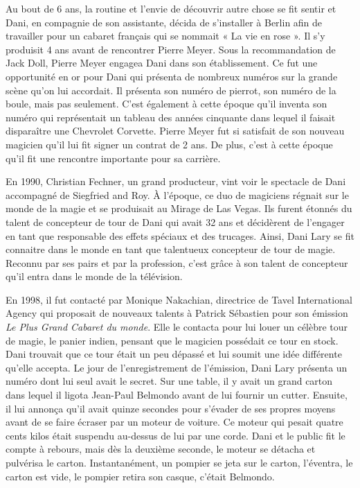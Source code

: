 Au bout de 6 ans, la routine et l’envie de découvrir autre chose se fit sentir et Dani, en compagnie de son assistante, décida de s’installer à Berlin afin de travailler pour un cabaret français qui se nommait « La vie en rose ». Il s’y produisit 4 ans avant de rencontrer Pierre Meyer. Sous la recommandation de Jack Doll, Pierre Meyer engagea Dani dans son établissement. Ce fut une opportunité en or pour Dani qui présenta de nombreux numéros sur la grande scène qu'on lui accordait. Il présenta son numéro de pierrot, son numéro de la boule, mais pas seulement. C’est également à cette époque qu’il inventa son numéro qui représentait un tableau des années cinquante dans lequel il faisait disparaître une Chevrolet Corvette. Pierre Meyer fut si satisfait de son nouveau magicien qu'il lui fit signer un contrat de 2 ans. De plus, c'est à cette époque qu’il fit une rencontre importante pour sa carrière.

En 1990, Christian Fechner, un grand producteur, vint voir le spectacle de Dani accompagné de Siegfried and Roy. À l’époque, ce duo de magiciens régnait sur le monde de la magie et se produisait au Mirage de Las Vegas. Ils furent étonnés du talent de concepteur de tour de Dani qui avait 32 ans et décidèrent de l’engager en tant que responsable des effets spéciaux et des trucages. Ainsi, Dani Lary se fit connaitre dans le monde en tant que talentueux concepteur de tour de magie. Reconnu par ses pairs et par la profession, c’est grâce à son talent de concepteur qu'il entra dans le monde de la télévision. 

En 1998, il fut contacté par Monique Nakachian, directrice de Tavel International Agency qui proposait de nouveaux talents à Patrick Sébastien pour son émission \textit{Le Plus Grand Cabaret du monde}. Elle le contacta pour lui louer un célèbre tour de magie, le panier indien, pensant que le magicien possédait ce tour en stock. Dani trouvait que ce tour était un peu dépassé et lui soumit une idée différente qu’elle accepta. Le jour de l’enregistrement de l’émission, Dani Lary présenta un numéro dont lui seul avait le secret. Sur une table, il y avait un grand carton dans lequel il ligota Jean-Paul Belmondo avant de lui fournir un cutter. Ensuite, il lui annonça qu'il avait quinze secondes pour s’évader de ses propres moyens avant de se faire écraser par un moteur de voiture. Ce moteur qui pesait quatre cents kilos était suspendu au-dessus de lui par une corde. Dani et le public fit le compte à rebours, mais dès la deuxième seconde, le moteur se détacha et pulvérisa le carton. Instantanément, un pompier se jeta sur le carton, l’éventra, le carton est vide, le pompier retira son casque, c'était Belmondo.

